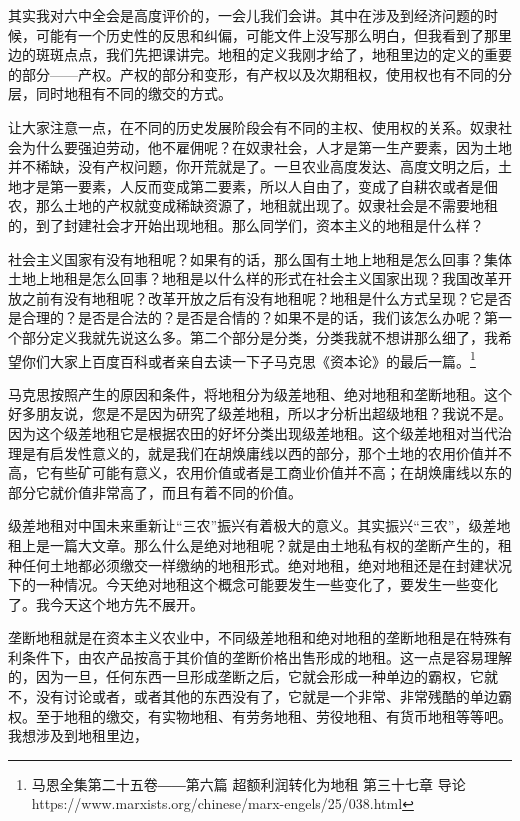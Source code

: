 \documentclass[UTF8, 12pt, a4paper]{ctexrep}
\begin{document}
其实我对六中全会是高度评价的，一会儿我们会讲。其中在涉及到经济问题的时候，可能有一个历史性的反思和纠偏，可能文件上没写那么明白，但我看到了那里边的斑斑点点，我们先把课讲完。地租的定义我刚才给了，地租里边的定义的重要的部分——产权。产权的部分和变形，有产权以及次期租权，使用权也有不同的分层，同时地租有不同的缴交的方式。

让大家注意一点，在不同的历史发展阶段会有不同的主权、使用权的关系。奴隶社会为什么要强迫劳动，他不雇佣呢？在奴隶社会，人才是第一生产要素，因为土地并不稀缺，没有产权问题，你开荒就是了。一旦农业高度发达、高度文明之后，土地才是第一要素，人反而变成第二要素，所以人自由了，变成了自耕农或者是佃农，那么土地的产权就变成稀缺资源了，地租就出现了。奴隶社会是不需要地租的，到了封建社会才开始出现地租。那么同学们，资本主义的地租是什么样？

社会主义国家有没有地租呢？如果有的话，那么国有土地上地租是怎么回事？集体土地上地租是怎么回事？地租是以什么样的形式在社会主义国家出现？我国改革开放之前有没有地租呢？改革开放之后有没有地租呢？地租是什么方式呈现？它是否是合理的？是否是合法的？是否是合情的？如果不是的话，我们该怎么办呢？第一个部分定义我就先说这么多。第二个部分是分类，分类我就不想讲那么细了，我希望你们大家上百度百科或者亲自去读一下子马克思《资本论》的最后一篇。\footnote{马恩全集第二十五卷――第六篇 超额利润转化为地租 第三十七章 导论 https://www.marxists.org/chinese/marx-engels/25/038.html}

马克思按照产生的原因和条件，将地租分为级差地租、绝对地租和垄断地租。这个好多朋友说，您是不是因为研究了级差地租，所以才分析出超级地租？我说不是。因为这个级差地租它是根据农田的好坏分类出现级差地租。这个级差地租对当代治理是有启发性意义的，就是我们在胡焕庸线以西的部分，那个土地的农用价值并不高，它有些矿可能有意义，农用价值或者是工商业价值并不高；在胡焕庸线以东的部分它就价值非常高了，而且有着不同的价值。

级差地租对中国未来重新让“三农”振兴有着极大的意义。其实振兴“三农”，级差地租上是一篇大文章。那么什么是绝对地租呢？就是由土地私有权的垄断产生的，租种任何土地都必须缴交一样缴纳的地租形式。绝对地租，绝对地租还是在封建状况下的一种情况。今天绝对地租这个概念可能要发生一些变化了，要发生一些变化了。我今天这个地方先不展开。

垄断地租就是在资本主义农业中，不同级差地租和绝对地租的垄断地租是在特殊有利条件下，由农产品按高于其价值的垄断价格出售形成的地租。这一点是容易理解的，因为一旦，任何东西一旦形成垄断之后，它就会形成一种单边的霸权，它就不，没有讨论或者，或者其他的东西没有了，它就是一个非常、非常残酷的单边霸权。至于地租的缴交，有实物地租、有劳务地租、劳役地租、有货币地租等等吧。我想涉及到地租里边，
\end{document}
